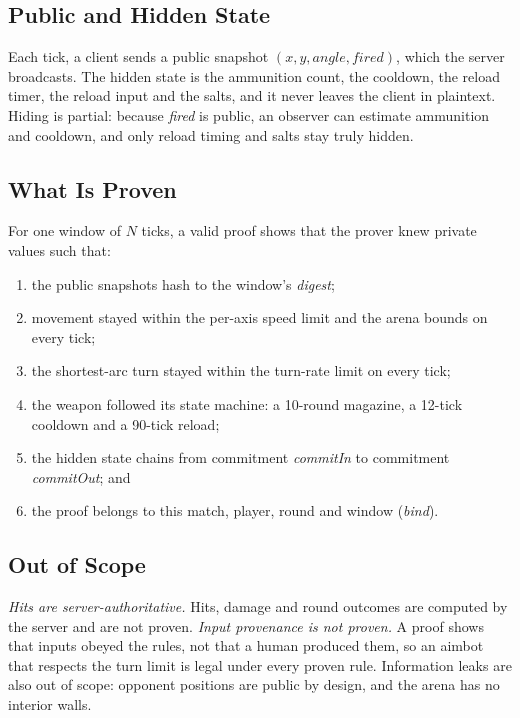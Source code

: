 \documentclass[conference]{IEEEtran}
\begin{document}
\subsection{Public and Hidden State}
Each tick, a client sends a public snapshot $(x, y, \mathit{angle}, \mathit{fired})$, which the server broadcasts.
The hidden state is the ammunition count, the cooldown, the reload timer, the reload input and the salts, and it never leaves the client in plaintext.
Hiding is partial: because \emph{fired} is public, an observer can estimate ammunition and cooldown, and only reload timing and salts stay truly hidden.

\subsection{What Is Proven}
For one window of $N$ ticks, a valid proof shows that the prover knew private values such that:
\begin{enumerate}
\item the public snapshots hash to the window's \emph{digest};
\item movement stayed within the per-axis speed limit and the arena bounds on every tick;
\item the shortest-arc turn stayed within the turn-rate limit on every tick;
\item the weapon followed its state machine: a 10-round magazine, a 12-tick cooldown and a 90-tick reload; %
\item the hidden state chains from commitment \emph{commitIn} to commitment \emph{commitOut}; and
\item the proof belongs to this match, player, round and window (\emph{bind}).
\end{enumerate}

\subsection{Out of Scope}
\emph{Hits are server-authoritative.} Hits, damage and round outcomes are computed by the server and are not proven.
\emph{Input provenance is not proven.} A proof shows that inputs obeyed the rules, not that a human produced them, so an aimbot that respects the turn limit is legal under every proven rule.
Information leaks are also out of scope: opponent positions are public by design, and the arena has no interior walls.

\end{document}
